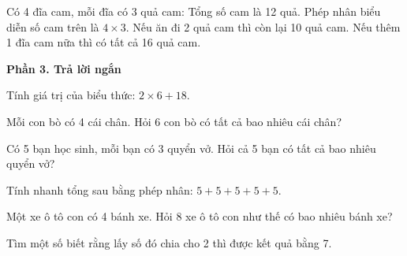 \begin{ex} %
Có 4 đĩa cam, mỗi đĩa có 3 quả cam:
\choiceTF
{\True Tổng số cam là 12 quả.}
{Phép nhân biểu diễn số cam trên là $4 \times 3$.}
{\True Nếu ăn đi 2 quả cam thì còn lại 10 quả cam.}
{Nếu thêm 1 đĩa cam nữa thì có tất cả 16 quả cam.}
\end{ex}

\textbf{Phần 3. Trả lời ngắn}

\begin{ex} %
Tính giá trị của biểu thức: $2 \times 6 + 18$.
\end{ex}

\begin{ex} %
Mỗi con bò có 4 cái chân. Hỏi 6 con bò có tất cả bao nhiêu cái chân?
\end{ex}

\begin{ex} %
Có 5 bạn học sinh, mỗi bạn có 3 quyển vở. Hỏi cả 5 bạn có tất cả bao nhiêu quyển vở?
\end{ex}

\begin{ex} %
Tính nhanh tổng sau bằng phép nhân: $5 + 5 + 5 + 5 + 5$.
\end{ex}

\begin{ex} %
Một xe ô tô con có 4 bánh xe. Hỏi 8 xe ô tô con như thế có bao nhiêu bánh xe?
\end{ex}

\begin{ex} %
Tìm một số biết rằng lấy số đó chia cho 2 thì được kết quả bằng 7.
\end{ex}
